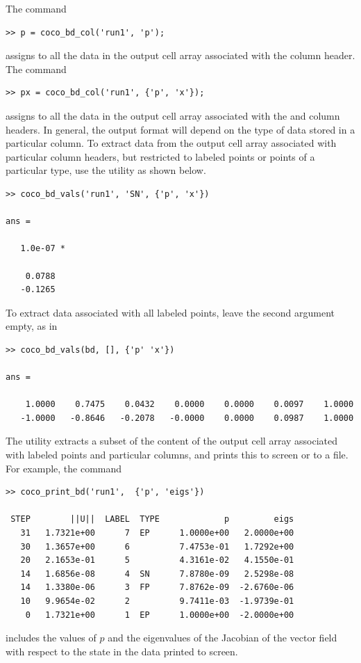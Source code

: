 The command
\begin{lstlisting}[language=coco-highlight,frame=lines]
>> p = coco_bd_col('run1', 'p');
\end{lstlisting}
assigns to  all the data in the output cell array associated with the  column header. The command
\begin{lstlisting}[language=coco-highlight,frame=lines]
>> px = coco_bd_col('run1', {'p', 'x'});
\end{lstlisting}
assigns to  all the data in the output cell array associated with the  and  column headers. In general, the output format will depend on the type of data stored in a particular column. To extract data from the output cell array associated with particular column headers, but restricted to labeled points or points of a particular type, use the  utility as shown below.
\begin{lstlisting}[language=coco-highlight,frame=lines]
>> coco_bd_vals('run1', 'SN', {'p', 'x'})

ans =

   1.0e-07 *

    0.0788
   -0.1265
\end{lstlisting}
To extract data associated with all labeled points, leave the second argument empty, as in
\begin{lstlisting}[language=coco-highlight,frame=lines]
>> coco_bd_vals(bd, [], {'p' 'x'})

ans =

    1.0000    0.7475    0.0432    0.0000    0.0000    0.0097    1.0000
   -1.0000   -0.8646   -0.2078   -0.0000    0.0000    0.0987    1.0000
\end{lstlisting}

The  utility extracts a subset of the content of the output cell array associated with labeled points and particular columns, and prints this to screen or to a file. For example, the command
\begin{lstlisting}[language=coco-highlight,frame=lines]
>> coco_print_bd('run1',  {'p', 'eigs'})

 STEP        ||U||  LABEL  TYPE             p         eigs
   31   1.7321e+00      7  EP      1.0000e+00   2.0000e+00
   30   1.3657e+00      6          7.4753e-01   1.7292e+00
   20   2.1653e-01      5          4.3161e-02   4.1550e-01
   14   1.6856e-08      4  SN      7.8780e-09   2.5298e-08
   14   1.3380e-06      3  FP      7.8762e-09  -2.6760e-06
   10   9.9654e-02      2          9.7411e-03  -1.9739e-01
    0   1.7321e+00      1  EP      1.0000e+00  -2.0000e+00
\end{lstlisting}
includes the values of $p$ and the eigenvalues of the Jacobian of the vector field with respect to the state in the data printed to screen.

